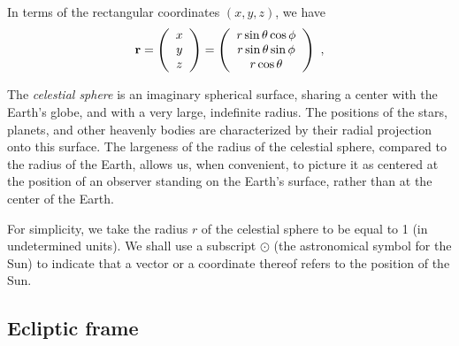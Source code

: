 In terms of the rectangular coordinates $(x, y, z)$, we have
\begin{equation}
\VV r = \left(\begin{array}{c} x \\ y \\ z \end{array} \right) = \left( \begin{array}{c} r \sin \theta \cos \phi  \\ r \sin \theta \sin \phi \\ r \cos \theta \end{array} \right)~,
\la{eq:spherical}
\end{equation}

The {\it celestial sphere} is an imaginary spherical surface, sharing a center with the Earth's globe, and with a very large, indefinite radius.  The positions of the stars, planets, and other heavenly bodies are characterized by their radial projection onto this surface.  The largeness of the radius of the celestial sphere, compared to the radius of the Earth, allows us, when convenient, to picture it as centered at the position of an observer standing on the Earth's surface, rather than at the center of the Earth.

For simplicity, we take the radius $r$ of the celestial sphere to be equal to 1 (in undetermined units).  We shall use a subscript $\odot$ (the astronomical symbol for the Sun) to indicate that a vector or a coordinate thereof refers to the position of the Sun.

\subsection{Ecliptic frame}

